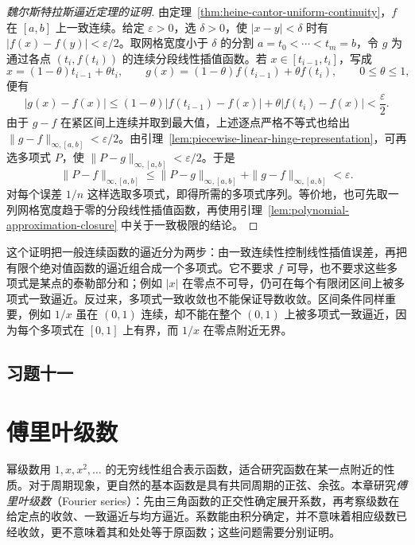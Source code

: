 \documentclass[UTF8,12pt,a4paper,fontset=fandol]{ctexbook}
\begin{document}
\begin{proof}[魏尔斯特拉斯逼近定理的证明]
由定理~\ref{thm:heine-cantor-uniform-continuity}，$f$ 在 $[a,b]$ 上一致连续。给定 $\varepsilon>0$，选 $\delta>0$，使 $|x-y|<\delta$ 时有 $|f(x)-f(y)|<\varepsilon/2$。取网格宽度小于 $\delta$ 的分割 $a=t_0<\cdots<t_m=b$，令 $g$ 为通过各点 $(t_i,f(t_i))$ 的连续分段线性插值函数。若 $x\in[t_{i-1},t_i]$，写成
\[
    x=(1-\theta)t_{i-1}+\theta t_i,\qquad
    g(x)=(1-\theta)f(t_{i-1})+\theta f(t_i),
    \qquad 0\leq\theta\leq1,
\]
便有
\[
    |g(x)-f(x)|
       \leq(1-\theta)|f(t_{i-1})-f(x)|
          +\theta|f(t_i)-f(x)|<\frac\varepsilon2.
\]
由于 $g-f$ 在紧区间上连续并取到最大值，上述逐点严格不等式也给出 $\|g-f\|_{\infty,[a,b]}<\varepsilon/2$。由引理~\ref{lem:piecewise-linear-hinge-representation}，可再选多项式 $P$，使 $\|P-g\|_{\infty,[a,b]}<\varepsilon/2$。于是
\[
    \|P-f\|_{\infty,[a,b]}
       \leq\|P-g\|_{\infty,[a,b]}+\|g-f\|_{\infty,[a,b]}
       <\varepsilon.
\]
对每个误差 $1/n$ 这样选取多项式，即得所需的多项式序列。等价地，也可先取一列网格宽度趋于零的分段线性插值函数，再使用引理~\ref{lem:polynomial-approximation-closure} 中关于一致极限的结论。
\end{proof}

这个证明把一般连续函数的逼近分为两步：由一致连续性控制线性插值误差，再把有限个绝对值函数的逼近组合成一个多项式。它不要求 $f$ 可导，也不要求这些多项式是某点的泰勒部分和；例如 $|x|$ 在零点不可导，仍可在每个有限闭区间上被多项式一致逼近。反过来，多项式一致收敛也不能保证导数收敛。区间条件同样重要，例如 $1/x$ 虽在 $(0,1)$ 连续，却不能在整个 $(0,1)$ 上被多项式一致逼近，因为每个多项式在 $[0,1]$ 上有界，而 $1/x$ 在零点附近无界。

\section*{习题十一}

\chapter{傅里叶级数}
\label{chap:fourier-series}

幂级数用 $1,x,x^2,\ldots$ 的无穷线性组合表示函数，适合研究函数在某一点附近的性质。对于周期现象，更自然的基本函数是具有共同周期的正弦、余弦。本章研究\emph{傅里叶级数}（Fourier series）：先由三角函数的正交性确定展开系数，再考察级数在给定点的收敛、一致逼近与均方逼近。系数能由积分确定，并不意味着相应级数已经收敛，更不意味着其和处处等于原函数；这些问题需要分别证明。
\end{document}
